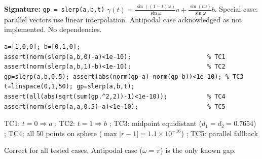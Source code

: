 \chapter{}
\begin{tcolorbox}[Abox,title={Analysis}]
\textbf{Signature:} \lstinline|gp = slerp(a,b,t)|\quad
$\gamma(t)=\frac{\sin((1-t)\omega)}{\sin\omega}a+\frac{\sin(t\omega)}{\sin\omega}b$. Special case: parallel vectors use linear interpolation. Antipodal case acknowledged as not implemented. No dependencies.
\end{tcolorbox}
\begin{lstlisting}[caption={Tests for slerp.m}]
a=[1,0,0]; b=[0,1,0];
assert(norm(slerp(a,b,0)-a)<1e-10);                     % TC1
assert(norm(slerp(a,b,1)-b)<1e-10);                     % TC2
gp=slerp(a,b,0.5); assert(abs(norm(gp-a)-norm(gp-b))<1e-10); % TC3
t=linspace(0,1,50); gp=slerp(a,b,t);
assert(all(abs(sqrt(sum(gp.^2,2))-1)<1e-10));           % TC4
assert(norm(slerp(a,a,0.5)-a)<1e-10);                   % TC5
\end{lstlisting}
\begin{tcolorbox}[Pbox,title={TC1--TC5 -- All pass}]
TC1: $t=0\Rightarrow a$ \APROVADO; TC2: $t=1\Rightarrow b$ \APROVADO; TC3: midpoint equidistant ($d_1=d_2=0.7654$) \APROVADO; TC4: all 50 points on sphere ($\max|r-1|=1.1\times10^{-16}$) \APROVADO; TC5: parallel fallback \APROVADO
\end{tcolorbox}
\begin{concl}
Correct for all tested cases. Antipodal case ($\omega=\pi$) is the only known gap.
\end{concl}


